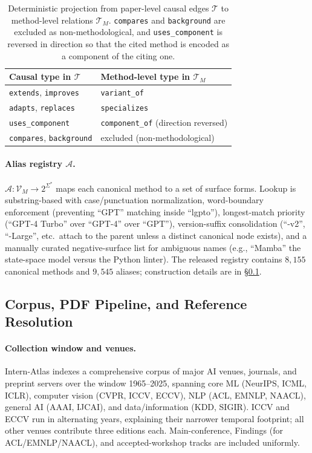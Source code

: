 \documentclass{llmxive}
\begin{document}
\begin{table}[!htbp]
\centering
\begin{tabularx}{\linewidth}{l X}
\toprule
Causal type in $\mathcal{T}$ & Method-level type in $\mathcal{T}_M$ \\
\midrule
\texttt{extends}, \texttt{improves} & \texttt{variant\_of} \\
\texttt{adapts}, \texttt{replaces} & \texttt{specializes} \\
\texttt{uses\_component} & \texttt{component\_of} (direction reversed) \\
\texttt{compares}, \texttt{background} & excluded (non-methodological) \\
\bottomrule
\end{tabularx}
\caption{Deterministic projection from paper-level causal edges $\mathcal{T}$ to method-level relations
$\mathcal{T}_M$. \texttt{compares} and \texttt{background} are excluded as non-methodological, and
\texttt{uses\_component} is reversed in direction so that the cited method is encoded as a component of the citing
one.}
\label{tab:projection}
\end{table}

\paragraph{Alias registry \texorpdfstring{$\mathcal{A}$}{A}.}
$\mathcal{A}:\mathcal{V}_M\to 2^{\Sigma^\ast}$ maps each canonical method to a set of surface forms. Lookup is
substring-based with case/punctuation normalization, word-boundary enforcement (preventing ``GPT'' matching inside
``lgpto''), longest-match priority (``GPT-4 Turbo'' over ``GPT-4'' over ``GPT''), version-suffix consolidation
(``-v2'', ``-Large'', etc.\ attach to the parent unless a distinct canonical node exists), and a manually curated
negative-surface list for ambiguous names (e.g., ``Mamba'' the state-space model versus the Python linter). The released registry contains $8,155$ canonical methods and $9,545$ aliases; construction details are in
\S\ref{app:corpus}.


\subsection{Corpus, PDF Pipeline, and Reference Resolution}
\label{app:corpus}

\paragraph{Collection window and venues.}
Intern-Atlas indexes a comprehensive corpus of major AI venues, journals, and preprint servers over the window 1965--2025, spanning core ML (NeurIPS, ICML, ICLR), computer vision (CVPR, ICCV, ECCV), NLP (ACL, EMNLP, NAACL), general AI (AAAI, IJCAI), and data/information (KDD, SIGIR). ICCV and ECCV run in alternating years, explaining their narrower temporal footprint; all other venues contribute three editions each. Main-conference, Findings (for ACL/EMNLP/NAACL), and accepted-workshop tracks are included uniformly.
\end{document}
